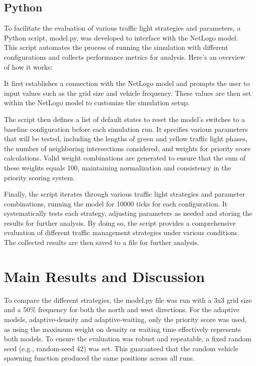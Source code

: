 \documentclass[sigconf]{acmart}
\begin{document}
\subsection{Python}
To facilitate the evaluation of various traffic light strategies and parameters, a Python script, model.py, was developed to interface with the NetLogo model. This script automates the process of running the simulation with different configurations and collects performance metrics for analysis. Here’s an overview of how it works:

It first establishes a connection with the NetLogo model and prompts the user to input values such as the grid size and vehicle frequency. These values are then set within the NetLogo model to customize the simulation setup.

The script then defines a list of default states to reset the model’s switches to a baseline configuration before each simulation run. It specifies various parameters that will be tested, including the lengths of green and yellow traffic light phases, the number of neighboring intersections considered, and weights for priority score calculations. Valid weight combinations are generated to ensure that the sum of these weights equals 100, maintaining normalization and consistency in the priority scoring system.

Finally, the script iterates through various traffic light strategies and parameter combinations, running the model for 10000 ticks for each configuration. It systematically tests each strategy, adjusting parameters as needed and storing the results for further analysis. By doing so, the script provides a comprehensive evaluation of different traffic management strategies under various conditions. The collected results are then saved to a file for further analysis.

\section{Main Results and Discussion}

To compare the different strategies, the model.py file was run with a 3x3 grid size and a 50\% frequency for both the north and west directions. For the adaptive models, adaptive-density and adaptive-waiting, only the priority score was used, as using the maximum weight on density or waiting time effectively represents both models. To ensure the evaluation was robust and repeatable, a fixed random seed (e.g., random-seed 42) was set. This guaranteed that the random vehicle spawning function produced the same positions across all runs.
\end{document}

